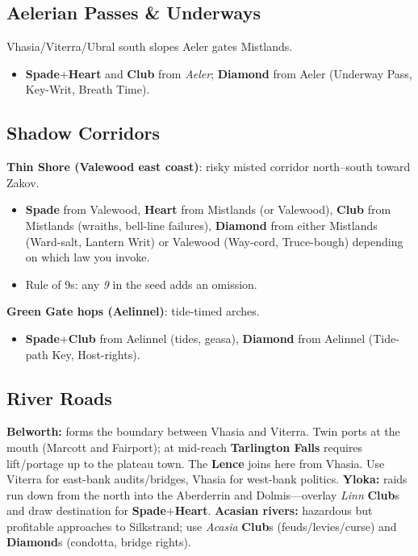 \documentclass[11pt]{article}
\newcommand{\SuitSpade}{\textbf{Spade}} %
\newcommand{\SuitHeart}{\textbf{Heart}} %
\newcommand{\SuitClub}{\textbf{Club}}   %
\newcommand{\SuitDiamond}{\textbf{Diamond}} %
\begin{document}
\subsection{Aelerian Passes & Underways}
Vhasia/Viterra/Ubral south slopes \textrightarrow{} Aeler gates \textrightarrow{} Mistlands.
\begin{itemize}
  \item \SuitSpade{}+\SuitHeart{} and \SuitClub{} from \emph{Aeler}; \SuitDiamond{} from Aeler (Underway Pass, Key-Writ, Breath Time).
\end{itemize}

\subsection{Shadow Corridors}
\textbf{Thin Shore (Valewood east coast)}: risky misted corridor north--south toward Zakov.
\begin{itemize}
  \item \SuitSpade{} from Valewood, \SuitHeart{} from Mistlands (or Valewood), \SuitClub{} from Mistlands (wraiths, bell-line failures), \SuitDiamond{} from either Mistlands (Ward-salt, Lantern Writ) or Valewood (Way-cord, Truce-bough) depending on which law you invoke.
  \item Rule of 9s: any \emph{9} in the seed adds an omission.
\end{itemize}
\textbf{Green Gate hops (Aelinnel)}: tide-timed arches.
\begin{itemize}
  \item \SuitSpade{}+\SuitClub{} from Aelinnel (tides, geasa), \SuitDiamond{} from Aelinnel (Tide-path Key, Host-rights).
\end{itemize}

\subsection{River Roads}
\textbf{Belworth:} forms the boundary between Vhasia and Viterra. Twin ports at the mouth (Marcott and Fairport); at mid-reach \textbf{Tarlington Falls} requires lift/portage up to the plateau town. The \textbf{Lence} joins here from Vhasia. Use Viterra for east-bank audits/bridges, Vhasia for west-bank politics.
\textbf{Yloka:} raids run down from the north into the Aberderrin and Dolmis---overlay \emph{Linn} \SuitClub{}s and draw destination for \SuitSpade{}+\SuitHeart{}.
\textbf{Acasian rivers:} hazardous but profitable approaches to Silkstrand; use \emph{Acasia} \SuitClub{}s (feuds/levies/curse) and \SuitDiamond{}s (condotta, bridge rights).
\end{document}
